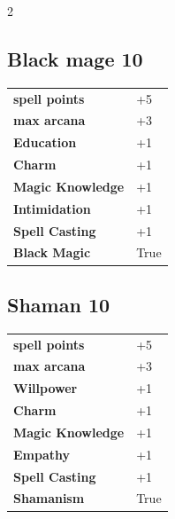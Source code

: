 \begin{multicols}{2}
\begin{tcolorbox}

\end{tcolorbox}

\begin{tcolorbox}
    \subsection*{Black mage \hfill \small{10 }}
    \tcblower




\begin{tabular}{@{}ll@{}}
    \textbf{spell points} & +5\\
    \textbf{max arcana} & +3\\
    \textbf{Education} & +1\\
    \textbf{Charm} & +1\\
    \textbf{Magic Knowledge} & +1\\
    \textbf{Intimidation} & +1\\
    \textbf{Spell Casting} & +1\\
    \textbf{Black Magic} & True\\
\end{tabular}


\end{tcolorbox}

\begin{tcolorbox}
    \subsection*{Shaman \hfill \small{10 }}
    \tcblower




\begin{tabular}{@{}ll@{}}
    \textbf{spell points} & +5\\
    \textbf{max arcana} & +3\\
    \textbf{Willpower} & +1\\
    \textbf{Charm} & +1\\
    \textbf{Magic Knowledge} & +1\\
    \textbf{Empathy} & +1\\
    \textbf{Spell Casting} & +1\\
    \textbf{Shamanism} & True\\
\end{tabular}


\end{tcolorbox}
\end{multicols}
